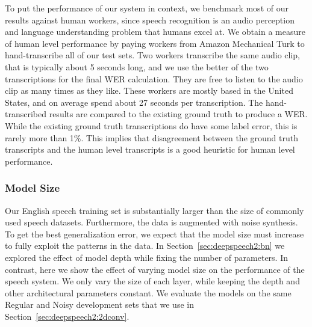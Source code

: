To put the performance of our system in context, we benchmark most of our
results against human workers, since speech recognition is an audio perception
and language understanding problem that humans excel at. We obtain a measure of
human level performance by paying workers from Amazon Mechanical Turk to
hand-transcribe all of our test sets. Two workers transcribe the same audio
clip, that is typically about 5 seconds long, and we use the better of the two
transcriptions for the final WER calculation. They are free to listen to the
audio clip as many times as they like. These workers are mostly based in the
United States, and on average spend about 27 seconds per transcription. The
hand-transcribed results are compared to the existing ground truth to produce a
WER. While the existing ground truth transcriptions do have some label error,
this is rarely more than 1\%. This implies that disagreement between the ground
truth transcripts and the human level transcripts is a good heuristic for human
level performance.

\subsubsection{Model Size}

Our English speech training set is substantially larger than the size of
commonly used speech datasets. Furthermore, the data is augmented with noise
synthesis. To get the best generalization error, we expect that the model size
must increase to fully exploit the patterns in the data. In
Section~\ref{sec:deepspeech2:bn} we explored the effect of model depth while
fixing the number of parameters. In contrast, here we show the effect of
varying model size on the performance of the speech system. We only vary the
size of each layer, while keeping the depth and other architectural parameters
constant. We evaluate the models on the same Regular and Noisy development sets
that we use in Section~\ref{sec:deepspeech2:2dconv}.

